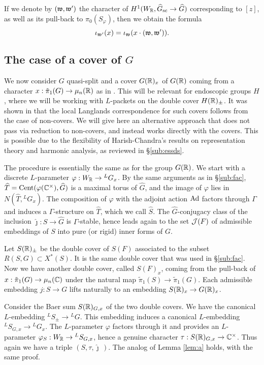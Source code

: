 \documentclass{article}
\theoremstyle{definition}
\numberwithin{equation}{section}
\renewcommand{\-}{\hyp{}}
\begin{document}
If we denote by $(\mathfrak{w},\mathfrak{w'})$ the character of $H^1(W_{\mathbb{R}},\widehat G_{\textrm{sc}} \to \widehat G)$ corresponding to $[z]$, as well as its pull-back to $\pi_0(S_\varphi)$, then we obtain the formula
\begin{equation}
	\iota_{\mathfrak{w'}}(x) = \iota_{\mathfrak{w}}(x \cdot (\mathfrak{w},\mathfrak{w'})).
\end{equation}


\subsection{The case of a cover of $G$} \label{sub:packetcover}

We now consider $G$ quasi-split and a cover $G(\mathbb{R})_x$ of $G(\mathbb{R})$ coming from a character $x : \tilde\pi_1(G) \to \mu_n(\mathbb{R})$ as in \cite{KalHDC}. This will be relevant for endoscopic groups $H$, where we will be working with $L$\-packets on the double cover $H(\mathbb{R})_\pm$. It was shown in \cite[\S2.6]{KalHDC} that the local Langlands correspondence for such covers follows from the case of non-covers. We will give here an alternative approach that does not pass via reduction to non-covers, and instead works directly with the covers. This is possible due to the flexibility of Harish-Chandra's results on representation theory and harmonic analysis, as reviewed in \S\ref{sub:essds}.

The procedure is essentially the same as for the group $G(\mathbb{R})$. We start with a discrete $L$\-parameter $\varphi : W_{\mathbb{R}} \to {^LG_x}$. By the same arguments as in \S\ref{sub:fac}, $\widehat T = \textrm{Cent}(\varphi(\mathbb{C}^\times),\widehat G)$ is a maximal torus of $\hat G$, and the image of $\varphi$ lies in $N(\hat T,{^LG_x})$. The composition of $\varphi$ with the adjoint action $\textrm{Ad}$ factors through $\Gamma$ and induces a $\Gamma$-structure on $\hat T$, which we call 
$\hat S$. The $\hat G$-conjugacy class of the inclusion $\hat\jmath : \hat S \to \hat G$ is $\Gamma$-stable, hence leads again to the set $\mathcal{J}(F)$ of admissible embeddings of $S$ into pure (or rigid) inner forms of $G$.

Let $S(\mathbb{R})_\pm$ be the double cover of $S(F)$ associated to the subset $R(S,G) \subset X^*(S)$. It is the same double cover that was used in \S\ref{sub:fac}. Now we have another double cover, called $S(F)_x$, coming from the pull-back of $x : \tilde\pi_1(G) \to \mu_n(\mathbb{C})$ under the natural map $\tilde\pi_1(S) \to \tilde\pi_1(G)$. Each admissible embedding $j : S \to G$ lifts naturally to an embedding $S(\mathbb{R})_x \to G(\mathbb{R})_x$.

Consider the Baer sum $S(\mathbb{R})_{G,x}$ of the two double covers. We have the canonical $L$\-embedding $^LS_\pm \to {^LG}$. This embedding induces a canonical $L$\-embedding ${^LS_{G,x}} \to {^LG_x}$. The $L$-parameter $\varphi$ factors through it and provides an $L$-parameter $\varphi_S : W_{\mathbb{R}} \to {^LS_{G,x}}$, hence a genuine character $\tau : S(\mathbb{R})_{G,x} \to \mathbb{C}^\times$. Thus again we have a triple $(S,\tau,\hat\jmath\,)$. The analog of Lemma \ref{lem:a} holds, with the same proof.
\end{document}
